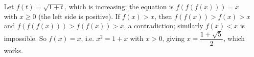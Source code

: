 Let $f(t)=\sqrt{1+t}$, which is increasing; the equation is $f(f(f(x)))=x$ with $x\ge0$ (the left side is positive). If $f(x)>x$, then $f(f(x))>f(x)>x$ and $f(f(f(x)))>f(f(x))>x$, a contradiction; similarly $f(x)<x$ is impossible. So $f(x)=x$, i.e. $x^2=1+x$ with $x>0$, giving $x=\boxed{\dfrac{1+\sqrt5}{2}}$, which works.
